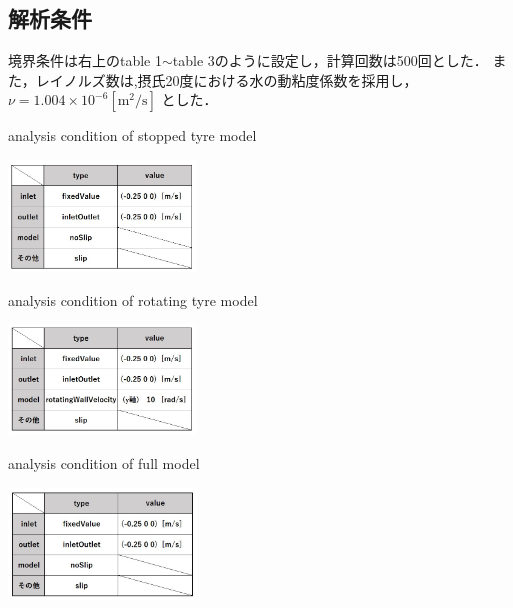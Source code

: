 \documentclass[twocolumn,a4j]{jsarticle}
\begin{document}
\subsection{解析条件}
境界条件は右上のtable 1$\sim$table 3のように設定し，計算回数は500回とした．
また，レイノルズ数は,摂氏20度における水の動粘度係数を採用し，
$\nu = 1.004 × 10^{-6} \left[\mathrm{m^2/s}\right]$
とした．
\begin{table}[htbp]
    \begin{center}
        \caption{analysis condition of stopped tyre model}
        \includegraphics[width=50mm]{images/image_2.jpg}
    \end{center}
\end{table}
\begin{table}[htbp]
    \begin{center}
        \caption{analysis condition of rotating tyre model}
        \includegraphics[width=50mm]{images/image_3.jpg}
        \caption{analysis condition of full model}
        \includegraphics[width=50mm]{images/image_4.jpg}
    \end{center}
\end{table}

\newpage
\end{document}
